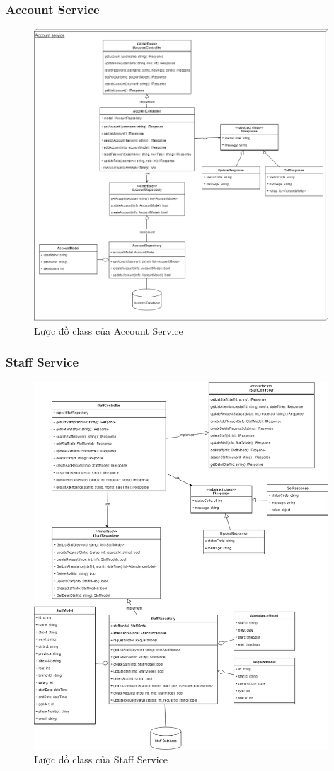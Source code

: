 \subsubsection{Account Service}
\begin{figure}[!htp]
	\centering
	\includegraphics[width=11cm]{img/Architecture/service/AccountService.png}
	\newline
	\caption{Lược đồ class của Account Service}
\end{figure}



\subsubsection{Staff Service}
\begin{figure}[!htp]
	\centering
	\includegraphics[width=11cm]{img/Architecture/service/StaffService.png}
	\newline
	\caption{Lược đồ class của Staff Service}
\end{figure}

